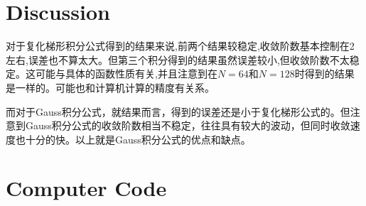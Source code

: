 \documentclass{article}
\begin{document}
	\section{Discussion}
	
	对于复化梯形积分公式得到的结果来说,前两个结果较稳定,收敛阶数基本控制在2左右,误差也不算太大。但第三个积分得到的结果虽然误差较小,但收敛阶数不太稳定。这可能与具体的函数性质有关,并且注意到在$N=64$和$N=128$时得到的结果是一样的。可能也和计算机计算的精度有关系。
	
	而对于Gauss积分公式，就结果而言，得到的误差还是小于复化梯形公式的。但注意到Gauss积分公式的收敛阶数相当不稳定，往往具有较大的波动，但同时收敛速度也十分的快。以上就是Gauss积分公式的优点和缺点。
	
	
	
	
	
	
	\section{Computer Code}
	
	
	
	
	
	
	
\end{document}
